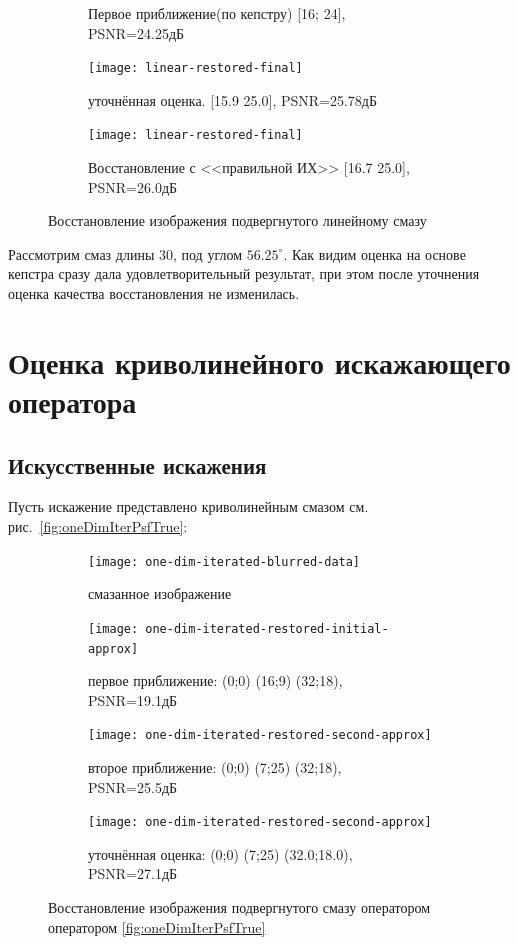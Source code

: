 \begin{figure}[h!]
\begin{subfigure}[t]{0.32\textwidth}
	\caption{Первое приближение(по кепстру) [16; 24], PSNR=24.25дБ}
	\label{fig:liftingbodyInitial}
	\end{subfigure}
	\hfill
	\begin{subfigure}[t]{0.32\textwidth}
		\centering
		\texttt{[image: linear-restored-final]}
		\caption{уточнённая оценка. [15.9 25.0], PSNR=25.78дБ}
		\label{fig:liftingFinal}
	\end{subfigure}
	\hfill
	\begin{subfigure}[t]{0.32\textwidth}
		\centering
		\texttt{[image: linear-restored-final]}
		\caption{Восстановление с <<правильной ИХ>> [16.7 25.0], PSNR=26.0дБ}
		\label{fig:liftingReal}
	\end{subfigure}
	\caption{Восстановление изображения подвергнутого линейному смазу}
	\label{fig:linear}
\end{figure}

Рассмотрим смаз длины 30, под углом $56.25^\circ$. Как видим оценка на основе кепстра сразу дала удовлетворительный результат, при этом после уточнения оценка качества восстановления не изменилась.

\section{Оценка криволинейного искажающего оператора}
\subsection{Искусственные искажения}
Пусть искажение представлено криволинейным смазом см. рис.~\ref{fig:oneDimIterPsfTrue}:
\begin{figure}[h!]
	\begin{subfigure}[t]{0.45\textwidth}
		\centering
		\texttt{[image: one-dim-iterated-blurred-data]}
		\caption{смазанное изображение}
		\label{fig:oneDimIterBlurred}
	\end{subfigure}
	\hfill
	\begin{subfigure}[t]{0.45\textwidth}
		\centering
		\texttt{[image: one-dim-iterated-restored-initial-approx]}
		\caption{первое приближение: (0;0) (16;9) (32;18), PSNR=19.1дБ}
		\label{fig:oneDimIterInitial}
	\end{subfigure}

	\begin{subfigure}[t]{0.45\textwidth}
		\centering
		\texttt{[image: one-dim-iterated-restored-second-approx]}
		\caption{второе приближение: (0;0) (7;25) (32;18), PSNR=25.5дБ}
		\label{fig:oneDimIterSecond}
	\end{subfigure}
	\hfill
	\begin{subfigure}[t]{0.45\textwidth}
		\centering
		\texttt{[image: one-dim-iterated-restored-second-approx]}
		\caption{уточнённая оценка: (0;0) (7;25) (32.0;18.0), PSNR=27.1дБ}
		\label{fig:oneDimIterFinal}
	\end{subfigure}
	\caption{Восстановление изображения подвергнутого смазу оператором  оператором \ref{fig:oneDimIterPsfTrue}}
	\label{fig:oneDimIter}
\end{figure}

